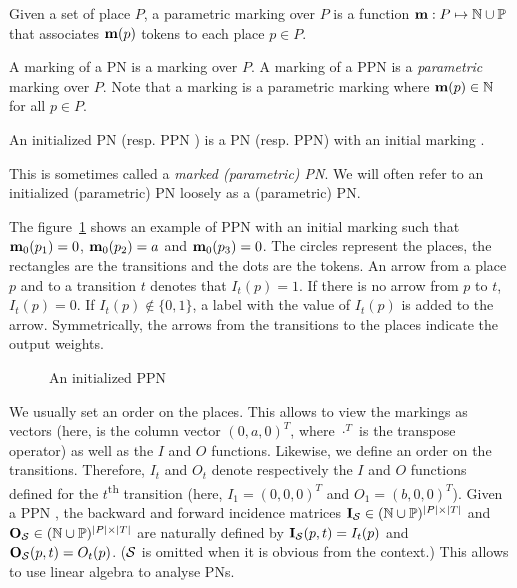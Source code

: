 \begin{defi}
  Given a set of place $P$, a parametric marking over $P$ is a function $\mathbf{m} : P \mapsto \mathbb{N} \cup \mathbb{P} $ that associates $\mathbf{m}(p)$ tokens to each place $p \in P$.
\end{defi}

A marking of a \ac{PN} \NPT is a marking over $P$.
A marking of a \ac{PPN} \SPTP is a \emph{parametric} marking over $P$.
Note that a marking \marq is a parametric marking where $\mathbf{m}(p) \in \mathbb{N}$ for all $p \in P$.

\begin{defi}
  An initialized \ac{PN} \NPTm (resp. \ac{PPN} \SPTPm) is a \ac{PN} (resp. \ac{PPN}) with an initial marking \marqi.
\end{defi}

This is sometimes called a \emph{marked (parametric) \ac{PN}}.
We will often refer to an initialized (parametric) \ac{PN} loosely as a (parametric) \ac{PN}.

The figure~\ref{fig:parametric-petri-net-example} shows an example of \ac{PPN} with an initial marking \marqi such that $\mathbf{m}_0(p_1) = 0$, $\mathbf{m}_0(p_2) = a$ and $\mathbf{m}_0(p_3) = 0$. The circles represent the places, the rectangles are the transitions and the dots are the tokens. An arrow from a place $p$ and to a transition $t$ denotes that $I_t(p) = 1$. If there is no arrow from $p$ to $t$, $I_t(p) = 0$. If $I_t(p) \notin \{0, 1\}$, a label with the value of $I_t(p)$ is added to the arrow.
Symmetrically, the arrows from the transitions to the places indicate the output weights.

\begin{figure}[h]
  \label{fig:parametric-petri-net-example}
  
  \caption{An initialized \ac{PPN}}
\end{figure}

We usually set an order on the places.
This allows to view the markings as vectors (here, \marqi is the column vector $(0, a, 0)^T$, where $\cdot^T$ is the transpose operator) as well as the $I$ and $O$ functions.
Likewise, we define an order on the transitions.
Therefore, $I_t$ and $O_t$ denote respectively the $I$ and $O$ functions defined for the $t$\textsuperscript{th} transition (here, $I_1 = (0, 0, 0)^T$ and $O_1 = (b, 0, 0)^T$).
Given a \ac{PPN} \SPTP, the backward and forward incidence matrices $\mathbf{I}_\mathcal{S} \in (\mathbb{N} \cup \mathbb{P})^{|P|\times|T|}$ and $\mathbf{O}_\mathcal{S} \in (\mathbb{N} \cup \mathbb{P})^{|P|\times|T|}$ are naturally defined by $\mathbf{I}_\mathcal{S}(p, t) = I_t(p)$ and $\mathbf{O}_\mathcal{S}(p, t) = O_t(p)$.
($\mathcal{S}$ is omitted when it is obvious from the context.)
This allows to use linear algebra to analyse \acp{PN}.

